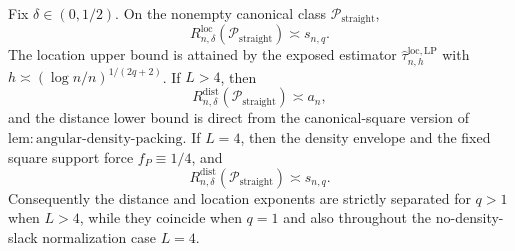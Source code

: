 Fix \(\delta\in(0,1/2)\).  On the nonempty canonical class
\(\mathcal P_{\mathrm{straight}}\),
\[
 R_{n,\delta}^{\mathrm{loc}}(\mathcal P_{\mathrm{straight}})
 \asymp s_{n,q}.
\]
The location upper bound is attained by the exposed estimator
\(\widehat\tau^{\mathrm{loc},\mathrm{LP}}_{n,h}\) with
\(h\asymp(\log n/n)^{1/(2q+2)}\).  If \(L>4\), then
\[
 R_{n,\delta}^{\mathrm{dist}}(\mathcal P_{\mathrm{straight}})
 \asymp a_n,
\]
and the distance lower bound is direct from the canonical-square version of
\(\mathrm{lem:angular\text{-}density\text{-}packing}\).  If \(L=4\),
then the density envelope and the fixed square support force
\(f_P\equiv1/4\), and
\[
 R_{n,\delta}^{\mathrm{dist}}(\mathcal P_{\mathrm{straight}})
 \asymp s_{n,q}.
\]
Consequently the distance and location exponents are strictly separated for
\(q>1\) when \(L>4\), while they coincide when \(q=1\) and also throughout
the no-density-slack normalization case \(L=4\).